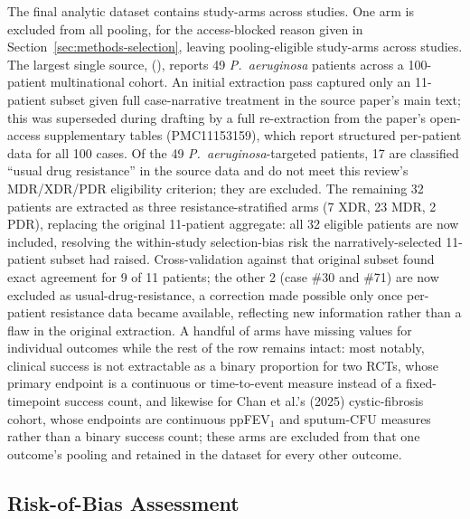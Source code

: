 The final analytic dataset contains \PrismaIncludedArms study-arms across \PrismaIncludedStudies studies. One arm \parencite{Leitner2021_lancetid_pyophage} is excluded from all pooling, for the access-blocked reason given in Section~\ref{sec:methods-selection}, leaving \PrismaPooledArms pooling-eligible study-arms across \PrismaPooledStudies studies. The largest single source, \citeauthor{Pirnay2024_natmicrobiol} (\citeyear{Pirnay2024_natmicrobiol}), reports 49 \textit{P.\ aeruginosa} patients across a 100-patient multinational cohort. An initial extraction pass captured only an 11-patient subset given full case-narrative treatment in the source paper's main text; this was superseded during drafting by a full re-extraction from the paper's open-access supplementary tables (PMC11153159), which report structured per-patient data for all 100 cases. Of the 49 \textit{P.\ aeruginosa}-targeted patients, 17 are classified ``usual drug resistance'' in the source data and do not meet this review's MDR/XDR/PDR eligibility criterion; they are excluded. The remaining 32 patients are extracted as three resistance-stratified arms (7 XDR, 23 MDR, 2 PDR), replacing the original 11-patient aggregate: all 32 eligible patients are now included, resolving the within-study selection-bias risk the narratively-selected 11-patient subset had raised. Cross-validation against that original subset found exact agreement for 9 of 11 patients; the other 2 (case \#30 and \#71) are now excluded as usual-drug-resistance, a correction made possible only once per-patient resistance data became available, reflecting new information rather than a flaw in the original extraction. A handful of arms have missing values for individual outcomes while the rest of the row remains intact: most notably, clinical success is not extractable as a binary proportion for two RCTs, whose primary endpoint is a continuous or time-to-event measure instead of a fixed-timepoint success count, and likewise for Chan et al.'s (2025) cystic-fibrosis cohort, whose endpoints are continuous ppFEV$_1$ and sputum-CFU measures rather than a binary success count; these arms are excluded from that one outcome's pooling and retained in the dataset for every other outcome.

\subsection{Risk-of-Bias Assessment}
\label{sec:methods-rob}

